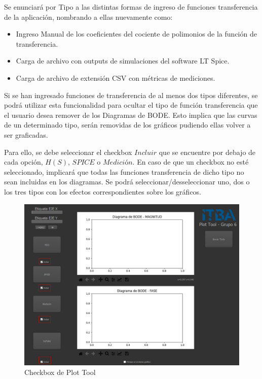 Se enunciará por Tipo a las distintas formas de ingreso de funciones transferencia de la aplicación, nombrando a ellas nuevamente como:

\begin{itemize}
    \item Ingreso Manual de los coeficientes del cociente de polimonios de la función de transferencia.
    \item Carga de archivo con outputs de simulaciones del software LT Spice.
    \item Carga de archivo de extensión CSV con métricas de mediciones. 

\end{itemize}

Si se han ingresado funciones de transferencia de al menos dos tipos diferentes, se podrá utilizar esta funcionalidad para ocultar el tipo de función transferencia que el usuario desea remover de los Diagramas de BODE.
Esto implica que las curvas de un determinado tipo, serán removidas de los gráficos pudiendo ellas volver a ser graficadas.

Para ello, se debe seleccionar el checkbox $Incluir$ que se encuentre por debajo de cada opción, $H(S)$, $SPICE$ o $Medición$. En caso de que un checkbox no esté seleccionado, implicará que todas las funciones transferencia de dicho tipo no sean incluidas en los diagramas. 
Se podrá seleccionar/desseleccionar uno, dos o los tres tipos con los efectos correspondientes sobre los gráficos.

\begin{figure}[!htb] 
    \centering 
    \includegraphics [width=0.8
    \textwidth] {../EJ2/LatexScreenshots/plotToolVaciaCheck.png} 
    \caption{Checkbox de Plot Tool}
    \label{fig:checkBoxPlotTool}
\end{figure}

